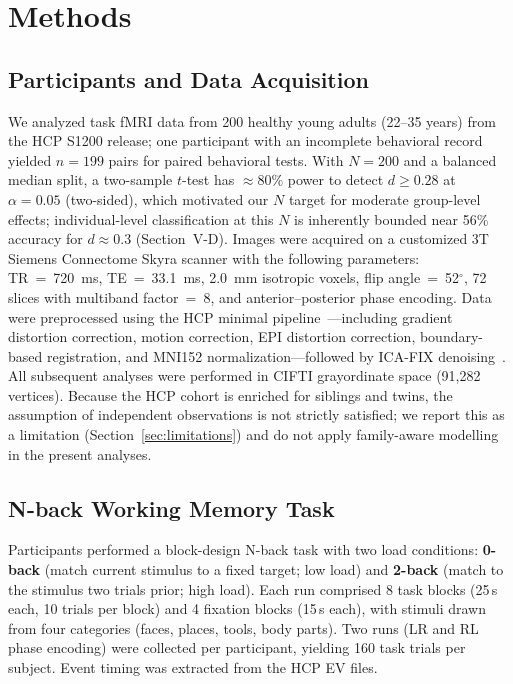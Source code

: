 \documentclass[conference]{IEEEtran}
\begin{document}
\section{Methods}

\subsection{Participants and Data Acquisition}
We analyzed task fMRI data from 200 healthy young adults (22--35 years) from the HCP S1200 release; one participant with an incomplete behavioral record yielded $n=199$ pairs for paired behavioral tests. With $N=200$ and a balanced median split, a two-sample $t$-test has $\approx 80\%$ power to detect $d\geq 0.28$ at $\alpha=0.05$ (two-sided), which motivated our $N$ target for moderate group-level effects; individual-level classification at this $N$ is inherently bounded near 56\% accuracy for $d\approx 0.3$ (Section~V-D). Images were acquired on a customized 3T Siemens Connectome Skyra scanner with the following parameters: TR~=~720~ms, TE~=~33.1~ms, 2.0~mm isotropic voxels, flip angle~=~52$^\circ$, 72 slices with multiband factor~=~8, and anterior--posterior phase encoding. Data were preprocessed using the HCP minimal pipeline~\cite{glasser2013minimal}---including gradient distortion correction, motion correction, EPI distortion correction, boundary-based registration, and MNI152 normalization---followed by ICA-FIX denoising~\cite{griffanti2014ica}. All subsequent analyses were performed in CIFTI grayordinate space (91,282 vertices). Because the HCP cohort is enriched for siblings and twins, the assumption of independent observations is not strictly satisfied; we report this as a limitation (Section~\ref{sec:limitations}) and do not apply family-aware modelling in the present analyses.

\subsection{N-back Working Memory Task}
Participants performed a block-design N-back task with two load conditions: \textbf{0-back} (match current stimulus to a fixed target; low load) and \textbf{2-back} (match to the stimulus two trials prior; high load). Each run comprised 8 task blocks (25\,s each, 10 trials per block) and 4 fixation blocks (15\,s each), with stimuli drawn from four categories (faces, places, tools, body parts). Two runs (LR and RL phase encoding) were collected per participant, yielding 160 task trials per subject. Event timing was extracted from the HCP EV files.
\end{document}
